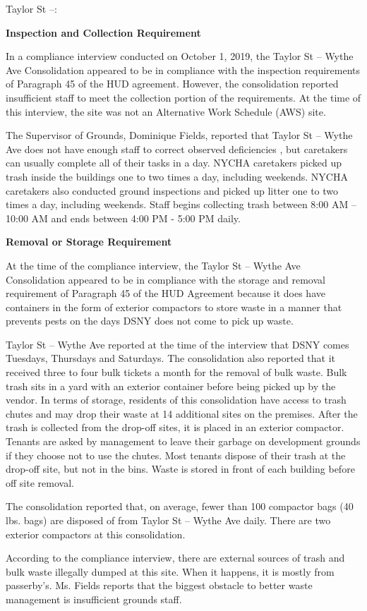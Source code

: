 Taylor St --:

\textbf{Inspection and Collection Requirement}

In a compliance interview conducted on October 1, 2019, the Taylor St -- Wythe Ave Consolidation appeared to be in compliance with the inspection requirements of Paragraph 45 of the HUD agreement. However, the consolidation reported insufficient staff to meet the collection portion of the requirements. At the time of this interview, the site was not an Alternative Work Schedule (AWS) site. 

The Supervisor of Grounds, Dominique Fields, reported that Taylor St -- Wythe Ave does not have enough staff to correct observed deficiencies , but caretakers can usually complete all of their tasks in a day. NYCHA caretakers picked up trash inside the buildings one to two times a day, including weekends. NYCHA caretakers also conducted ground inspections and picked up litter one to two times a day, including weekends. Staff begins collecting trash between 8:00 AM -- 10:00 AM and ends between 4:00 PM - 5:00 PM daily. 

\textbf{Removal or Storage Requirement}

At the time of the compliance interview, the Taylor St -- Wythe Ave Consolidation appeared to be in compliance with the storage and removal requirement of Paragraph 45 of the HUD Agreement because it does have containers in the form of exterior compactors to store waste in a manner that prevents pests on the days DSNY does not come to pick up waste. 

Taylor St -- Wythe Ave reported at the time of the interview that DSNY comes Tuesdays, Thursdays and Saturdays. The consolidation also reported that it received three to four bulk tickets a month for the removal of bulk waste. Bulk trash sits in a yard with an exterior container before being picked up by the vendor. In terms of storage, residents of this consolidation have access to trash chutes and may drop their waste at 14 additional sites on the premises. After the trash is collected from the drop-off sites, it is placed in an exterior compactor. Tenants are asked by management to leave their garbage on development grounds if they choose not to use the chutes. Most tenants dispose of their trash at the drop-off site, but not in the bins. Waste is stored in front of each building before off site removal. 

The consolidation reported that, on average, fewer than 100 compactor bags (40 lbs. bags) are disposed of from Taylor St -- Wythe Ave daily. There are two exterior compactors at this consolidation.

According to the compliance interview, there are external sources of trash and bulk waste illegally dumped at this site. When it happens, it is mostly from passerby's. Ms. Fields reports that the biggest obstacle to better waste management is insufficient grounds staff.